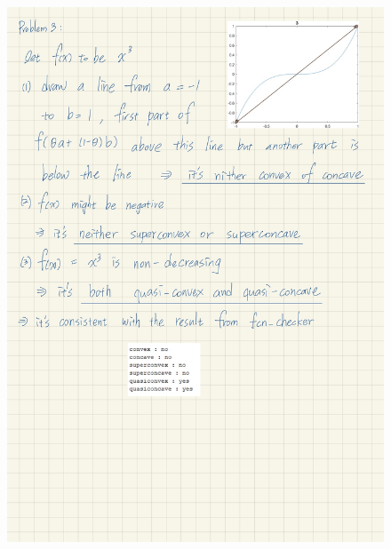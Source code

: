 \documentclass[a4paper, onecolumn, , 11pt]{IEEEtran}
\begin{document}
    \begin{figure}
        \centering
        \includegraphics[width=1\textwidth]{proofs/prob3.jpg}
    \end{figure}
\end{document}
